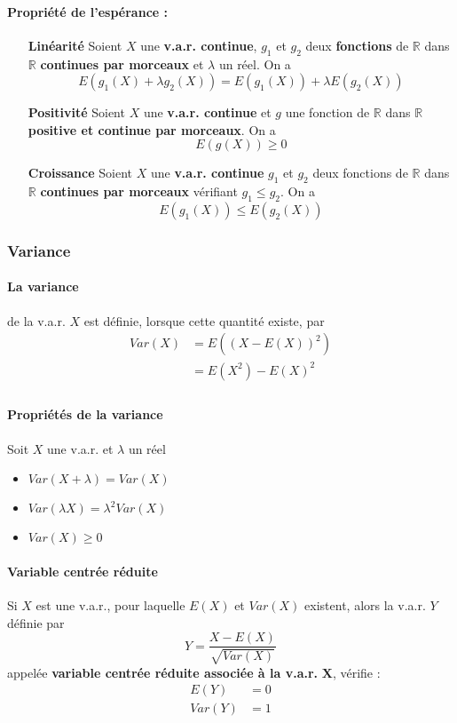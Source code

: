 \documentclass[10pt,a4paper,twoside]{article}
\begin{document}
\paragraph{Propriété de l'espérance :}
\begin{enumerate}
\item[\textbf{Linéarité}] Soient $X$ une \textbf{v.a.r. continue}, $g_{1}$ et $g_{2}$ deux \textbf{fonctions} de $\mathbb{R}$ dans $\mathbb{R}$ \textbf{continues par morceaux} et $\lambda$ un réel. On a
$$E(g_{1}(X)+\lambda g_{2}(X))=E(g_{1}(X))+\lambda E(g_{2}(X))$$
\item[\textbf{Positivité}] Soient $X$ une \textbf{v.a.r. continue} et $g$ une fonction de $\mathbb{R}$ dans $\mathbb{R}$ \textbf{positive et continue par morceaux}. On a
$$E(g(X))\geqslant 0$$
\item[\textbf{Croissance}] Soient $X$ une \textbf{v.a.r. continue} $g_{1}$ et $g_{2}$ deux fonctions de $\mathbb{R}$ dans $\mathbb{R}$ \textbf{continues par morceaux} vérifiant $g_{1}\leqslant g_{2}$. On a
$$E(g_{1}(X))\leqslant E(g_{2}(X))$$
\end{enumerate}

\subsubsection{Variance}
\paragraph{La variance} de la v.a.r. $X$ est définie, lorsque cette quantité existe, par
\begin{align*}
Var(X) & = E\left(\left(X-E\left(X\right)\right)^{2}\right) \\
 & = E(X^{2}) - E(X)^{2}\\
\end{align*}

\paragraph{Propriétés de la variance} Soit $X$ une v.a.r. et $\lambda$ un réel
\begin{itemize}
\item $Var(X+\lambda) = Var(X)$
\item $Var(\lambda X) = \lambda^{2}Var(X)$
\item $Var(X) \geqslant 0$
\end{itemize}

\paragraph{Variable centrée réduite} Si $X$ est une v.a.r., pour laquelle $E(X)$ et $Var(X)$ existent, alors la v.a.r. $Y$ définie par
$$Y=\frac{X-E(X)}{\sqrt{Var(X)}}$$
appelée \textbf{variable centrée réduite associée à la v.a.r.} $\mathbf{X}$, vérifie :
\begin{align*}
E(Y) &= 0\\
Var(Y)&=1
\end{align*}
\end{document}
